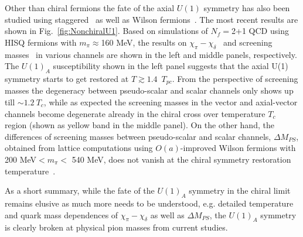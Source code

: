 \documentclass{PoS}
\begin{document}
Other than chiral fermions the fate of the axial $U(1)$ symmetry has also been studied using staggered~\cite{Cheng:2010fe,Dick:2015twa,Petreczky:2016vrs} as well as Wilson fermions~\cite{Brandt:2016daq}. The most recent results are shown in Fig.~\ref{fig:NonchiralU1}. Based on simulations of $N_f=$2+1 QCD using HISQ fermions with $m_\pi\approx$160 MeV, the results on $\chi_\pi-\chi_\delta$~\cite{Petreczky:2016vrs} and screening masses~\cite{Maezawa2016} in various channels are shown in the left and middle panels, respectively.
The $U(1)_A$ susceptibility shown in the left panel suggests that the axial U(1) symmetry starts to get restored at $T\gtrsim 1.4$~$T_{pc}$. From the perspective of screening masses 
the degeneracy between pseudo-scalar and scalar channels only shows up till $\sim1.2~T_c$, while as expected the screening masses in the vector and axial-vector  channels become degenerate already in the chiral cross over temperature $T_c$ region 
(shown as yellow band in the middle panel).  On the other hand, the differences of screening masses between pseudo-scalar and scalar channels, $\Delta M_{PS}$, obtained from lattice computations using $O(a)$-improved Wilson fermions with 200 MeV$<m_\pi <$ 540 MeV, does not vanish at the chiral symmetry restoration temperature~\cite{Brandt:2016daq}. 


As a short summary, while the fate of the $U(1)_A$ symmetry in the chiral limit remains elusive as much more needs to be understood, e.g. detailed temperature and quark mass dependences of $\chi_\pi-\chi_\delta$ as well as $\Delta M_{PS}$, the $U(1)_A$ symmetry is clearly broken at physical pion masses from current studies.



\end{document}
